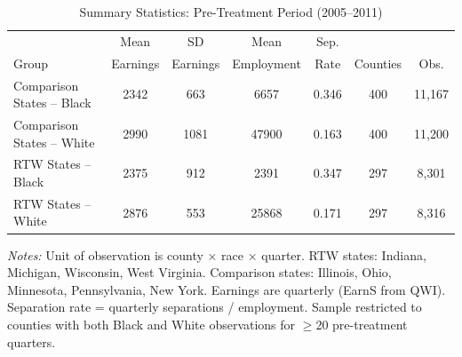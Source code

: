 \begin{table}[htbp]
\centering
\caption{Summary Statistics: Pre-Treatment Period (2005--2011)}
\label{tab:sumstats}
\begin{threeparttable}
\small
\begin{tabular}{lcccccc}
\toprule
 & Mean & SD & Mean & Sep. & & \\
Group & Earnings & Earnings & Employment & Rate & Counties & Obs. \\
\midrule
Comparison States -- Black & 2342 & 663 & 6657 & 0.346 & 400 & 11,167 \\
Comparison States -- White & 2990 & 1081 & 47900 & 0.163 & 400 & 11,200 \\
\midrule
RTW States -- Black & 2375 & 912 & 2391 & 0.347 & 297 & 8,301 \\
RTW States -- White & 2876 & 553 & 25868 & 0.171 & 297 & 8,316 \\
\bottomrule
\end{tabular}
\begin{tablenotes}[flushleft]\footnotesize\sloppy
\item \textit{Notes:} Unit of observation is county $\times$ race $\times$ quarter. RTW states: Indiana, Michigan, Wisconsin, West Virginia. Comparison states: Illinois, Ohio, Minnesota, Pennsylvania, New York. Earnings are quarterly (EarnS from QWI). Separation rate = quarterly separations / employment. Sample restricted to counties with both Black and White observations for $\geq$20 pre-treatment quarters.
\end{tablenotes}
\end{threeparttable}
\end{table}
